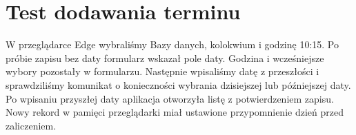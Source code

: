\section{Test dodawania terminu}\label{sec:testy}
W przeglądarce Edge wybraliśmy Bazy danych, kolokwium i godzinę 10:15.
Po próbie zapisu bez daty formularz wskazał pole daty. Godzina i wcześniejsze wybory pozostały w formularzu.
Następnie wpisaliśmy datę z przeszłości i sprawdziliśmy komunikat o konieczności wybrania dzisiejszej lub późniejszej daty.
Po wpisaniu przyszłej daty aplikacja otworzyła listę z potwierdzeniem zapisu.
Nowy rekord w pamięci przeglądarki miał ustawione przypomnienie dzień przed zaliczeniem.
